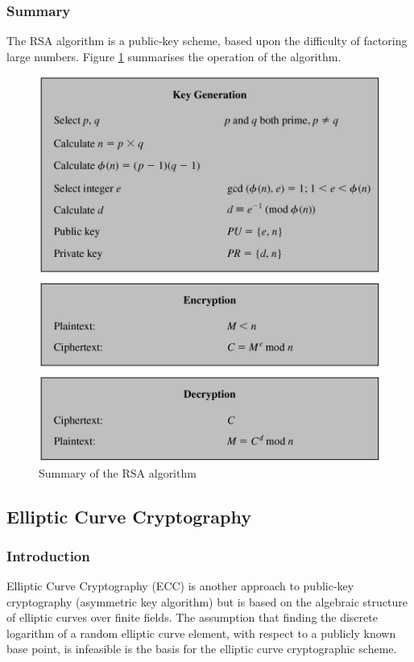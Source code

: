 \documentclass[a4paper,10pt]{report}
\begin{document}
\subsubsection{Summary}

The RSA algorithm is a public-key scheme, based upon the difficulty of factoring large numbers. Figure \ref{fig:rsasum} summarises the operation of the algorithm.

\begin{figure}[htb]
\centering
\includegraphics[scale=0.7]{images/rsasum.jpg}
\caption{Summary of the RSA algorithm}
\label{fig:rsasum}
\end{figure}

\subsection{Elliptic Curve Cryptography}

\subsubsection{Introduction}

Elliptic Curve Cryptography (ECC) is another approach to public-key cryptography (asymmetric key algorithm) but is based on the algebraic structure of elliptic curves over finite fields. The assumption that finding the discrete logarithm of a random elliptic curve element, with respect to a publicly known base point, is infeasible is the basis for the elliptic curve cryptographic scheme.
\end{document}
